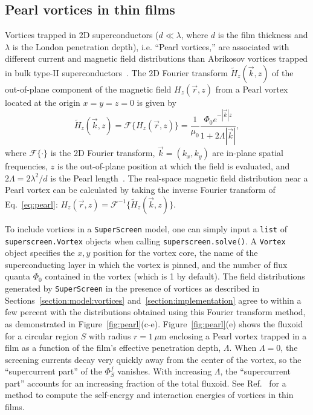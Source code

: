 \documentclass[final,3p,times,twocolumn]{elsarticle}
\newcommand{\inline}[1]{\texttt{#1}\xspace}
\newcommand{\SuperScreen}{\inline{SuperScreen}}
\newcommand{\um}{\mu\mathrm{m}}
\begin{document}
\subsection{Pearl vortices in thin films}
\label{section:examples:pearl-vortices}
Vortices trapped in 2D superconductors ($d\ll\lambda$, where $d$ is the film thickness and $\lambda$ is the London penetration depth), i.e. ``Pearl vortices,'' are associated with different current and magnetic field distributions than Abrikosov vortices trapped in bulk type-II superconductors~\cite{Pearl1964-cl}. The 2D Fourier transform $\tilde{H}_z(\vec{k}, z)$ of the out-of-plane component of the magnetic field $H_z(\vec{r}, z)$ from a Pearl vortex located at the origin $x=y=z=0$ is given by
\begin{equation}
    \tilde{H}_z(\vec{k}, z)=\mathcal{F}\{H_z(\vec{r}, z)\}=\frac{1}{\mu_0}\frac{\Phi_0e^{-|\vec{k}|z}}{1+2\Lambda|\vec{k}|},
    \label{eq:pearl}
\end{equation}
where $\mathcal{F}\{\cdot\}$ is the 2D Fourier transform, $\vec{k}=(k_x, k_y)$ are in-plane spatial frequencies, $z$ is the out-of-plane position at which the field is evaluated, and $2\Lambda = 2\lambda^2 / d$ is the Pearl length~\cite{Pearl1964-cl, Tafuri2004-ap}. The real-space magnetic field distribution near a Pearl vortex can be calculated by taking the inverse Fourier transform of Eq.~\ref{eq:pearl}: $H_z(\vec{r}, z)=\mathcal{F}^{-1}\{\tilde{H}_z(\vec{k}, z)\}$.

To include vortices in a \SuperScreen model, one can simply input a \inline{list} of \inline{superscreen.Vortex} objects when calling \inline{superscreen.solve()}. A \inline{Vortex} object specifies the $x,y$ position for the vortex core, the name of the superconducting layer in which the vortex is pinned, and the number of flux quanta $\Phi_0$ contained in the vortex (which is 1 by default). The field distributions generated by \SuperScreen in the presence of vortices as described in Sections~\ref{section:model:vortices} and~\ref{section:implementation} agree to within a few percent with the distributions obtained using this Fourier transform method, as demonstrated in Figure~\ref{fig:pearl}(c-e). Figure~\ref{fig:pearl}(e) shows the fluxoid for a circular region $S$ with radius $r=1\,\um$ enclosing a Pearl vortex trapped in a film as a function of the film's effective penetration depth, $\Lambda$. When $\Lambda=0$, the screening currents decay very quickly away from the center of the vortex, so the ``supercurrent part'' of the $\Phi^f_S$ vanishes. With increasing $\Lambda$, the ``supercurrent part'' accounts for an increasing fraction of the total fluxoid. See Ref.~\cite{Brandt2005-wj} for a method to compute the self-energy and interaction energies of vortices in thin films.
\end{document}
